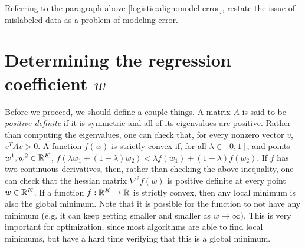 \begin{exercise}
  Referring to the paragraph above \eqref{logistic:align:model-error}, restate the issue of mislabeled data as a problem of modeling error.
\end{exercise}


\section{Determining the regression coefficient $w$}
Before we proceed, we should define a couple things.  A matrix $A$ is said to be \emph{positive definite} if it is symmetric and all of its eigenvalues are positive.  Rather than computing the eigenvalues, one can check that, for every nonzero vector $v$, $v^TAv>0$.  A function $f(w)$ is strictly convex if, for all $\lambda\in[0,1]$, and points $w^1, w^2\in{\mathbb R}^K$, $f(\lambda w_1 + (1-\lambda)w_2) < \lambda f(w_1) + (1-\lambda)f(w_2)$.  If $f$ has two continuous derivatives, then, rather than checking the above inequality, one can check that the hessian matrix $\nabla^2f(w)$ is positive definite at every point $w\in{\mathbb R}^K$.  If a function $f:{\mathbb R}^K\to{\mathbb R}$ is strictly convex, then any local minimum is also the global minimum.  Note that it is possible for the function to not have any minimum (e.g. it can keep getting smaller and smaller as $w\to\infty$).  This is very important for optimization, since most algorithms are able to find local minimums, but have a hard time verifying that this is a global minimum.

